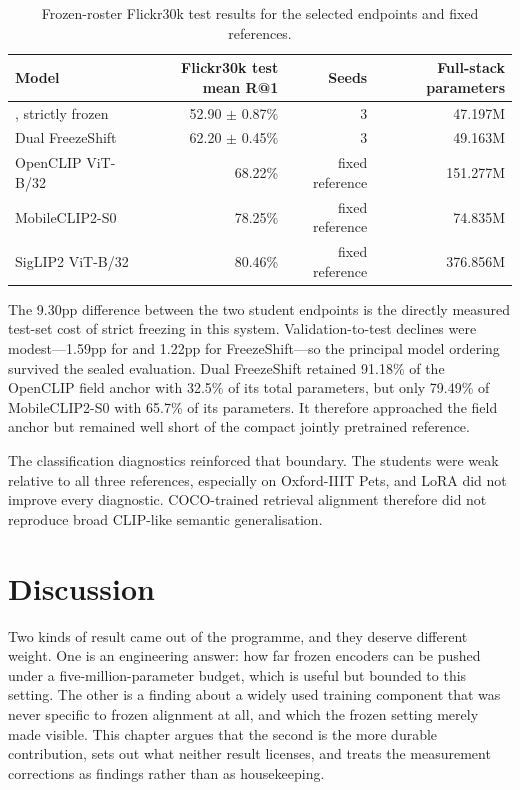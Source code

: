 \begin{table}[htbp]
\centering
\caption{Frozen-roster Flickr30k test results for the selected endpoints and fixed references.}
\label{tab:final-test}
\begin{tabular}{L{4.5cm}rrr}
\toprule
Model & Flickr30k test mean R@1 & Seeds & Full-stack parameters \\
\midrule
\MTone{}, strictly frozen & 52.90 $\pm$ 0.87\% & 3 & 47.197M \\
Dual FreezeShift & 62.20 $\pm$ 0.45\% & 3 & 49.163M \\
OpenCLIP ViT-B/32 & 68.22\% & fixed reference & 151.277M \\
MobileCLIP2-S0 & 78.25\% & fixed reference & 74.835M \\
SigLIP2 ViT-B/32 & 80.46\% & fixed reference & 376.856M \\
\bottomrule
\end{tabular}
\end{table}
The 9.30pp difference between the two student endpoints is the directly measured test-set cost of strict freezing in this system. Validation-to-test declines were modest---1.59pp for \MTone{} and 1.22pp for FreezeShift---so the principal model ordering survived the sealed evaluation. Dual FreezeShift retained 91.18\% of the OpenCLIP field anchor with 32.5\% of its total parameters, but only 79.49\% of MobileCLIP2-S0 with 65.7\% of its parameters. It therefore approached the field anchor but remained well short of the compact jointly pretrained reference.

The classification diagnostics reinforced that boundary. The students were weak relative to all three references, especially on Oxford-IIIT Pets, and LoRA did not improve every diagnostic. COCO-trained retrieval alignment therefore did not reproduce broad CLIP-like semantic generalisation.

\chapter{Discussion}
Two kinds of result came out of the programme, and they deserve different weight. One is an engineering answer: how far frozen encoders can be pushed under a five-million-parameter budget, which is useful but bounded to this setting. The other is a finding about a widely used training component that was never specific to frozen alignment at all, and which the frozen setting merely made visible. This chapter argues that the second is the more durable contribution, sets out what neither result licenses, and treats the measurement corrections as findings rather than as housekeeping.

